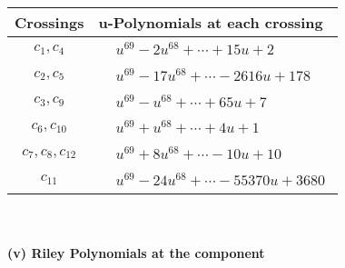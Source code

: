\documentclass[1p]{elsarticle_modified}
\theoremstyle{definition}
\begin{document}
\begin{tabular}{m{50pt}|m{274pt}}
Crossings & \hspace{64pt}u-Polynomials at each crossing \\
\hline $$\begin{aligned}c_{1},c_{4}\end{aligned}$$&$\begin{aligned}
&u^{69}-2 u^{68}+\cdots+15 u+2
\end{aligned}$\\
\hline $$\begin{aligned}c_{2},c_{5}\end{aligned}$$&$\begin{aligned}
&u^{69}-17 u^{68}+\cdots-2616 u+178
\end{aligned}$\\
\hline $$\begin{aligned}c_{3},c_{9}\end{aligned}$$&$\begin{aligned}
&u^{69}- u^{68}+\cdots+65 u+7
\end{aligned}$\\
\hline $$\begin{aligned}c_{6},c_{10}\end{aligned}$$&$\begin{aligned}
&u^{69}+u^{68}+\cdots+4 u+1
\end{aligned}$\\
\hline $$\begin{aligned}c_{7},c_{8},c_{12}\end{aligned}$$&$\begin{aligned}
&u^{69}+8 u^{68}+\cdots-10 u+10
\end{aligned}$\\
\hline $$\begin{aligned}c_{11}\end{aligned}$$&$\begin{aligned}
&u^{69}-24 u^{68}+\cdots-55370 u+3680
\end{aligned}$\\
\hline
\end{tabular}\\~\\
\newpage\renewcommand{\arraystretch}{1}
\flushleft \textbf{(v) Riley Polynomials at the component}\newline \\
\end{document}
